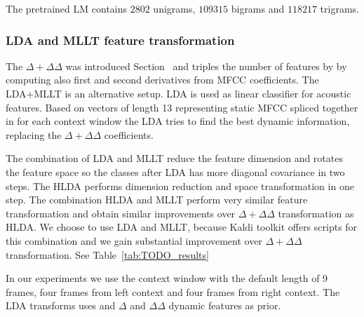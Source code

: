 The pretrained \ac{LM} contains $2802$ unigrams, $109315$ bigrams and
$118217$ trigrams. 

\subsubsection*{\acl{LDA} and \ac{MLLT} feature transformation}
The $\Delta + \Delta\Delta$ was introduced Section~\label{sub:param} and triples the number of features by by computing also first and second derivatives from \ac{MFCC} coefficients.
The \ac{LDA}+\ac{MLLT} is an alternative setup.
\ac{LDA} is used as linear classifier for acoustic features.
Based on vectors of length 13 representing static \ac{MFCC} 
spliced together in for each context window the \ac{LDA} tries to 
find the best dynamic information, replacing the $\Delta+\Delta\Delta$ coefficients.

The combination of \ac{LDA} and \ac{MLLT} reduce the feature dimension and
rotates the feature space so the classes after \ac{LDA} has more diagonal covariance in two steps.\cite{gopinath1998maximum}
The \ac{HLDA} performs dimension reduction and space transformation in one step.\cite{gales1999semi}
The combination \ac{HLDA} and \ac{MLLT} perform very similar feature transformation
and obtain similar improvements over $\Delta+\Delta\Delta$ transformation 
as \ac{HLDA}\cite{gales1999semi}\cite{gopinath1998maximum}.
We choose to use \ac{LDA} and \ac{MLLT}, because Kaldi toolkit offers scripts 
for this combination and we gain substantial improvement over $\Delta+\Delta\Delta$ transformation.
See Table~\ref{tab:TODO_results}

In our experiments we use the context window with the default length of 9 frames, 
four frames from left context and four frames from right context.
The \ac{LDA} transforms uses and $\Delta$ and $\Delta\Delta$ dynamic features as prior.






